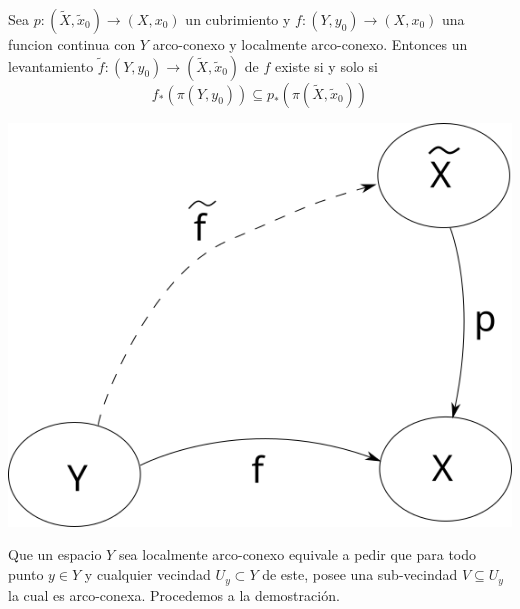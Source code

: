 \begin{teorema}\label{thm:lifting-theorem-general}
  Sea \(p : (\tilde X , \tilde x_0) \to ( X , x _0 )\) un cubrimiento y
  \(f : (Y , y_0) \to ( X , x _0 )\) una funcion continua con \(Y\)
  arco-conexo y localmente arco-conexo. Entonces un levantamiento
  \(\tilde f : (Y , y_0) \to (\tilde X, \tilde x _0)\) de \(f\) existe
  si y solo si
  \[ f_* \left( \pi (Y, y_0) \right) \subseteq p_* \left( \pi ( \tilde X
      , \tilde x_0 ) \right) \]
  \begin{center}
    \includegraphics[scale=0.3]{./imagenes/lifting-path-gen.png}
  \end{center}
\end{teorema}
Que un espacio \(Y\) sea localmente arco-conexo equivale a pedir que
para todo punto \(y \in Y\) y cualquier vecindad \(U_y \subset Y\) de
este, posee una sub-vecindad \(V \subseteq U_y\) la cual es arco-conexa.
Procedemos a la demostración.
